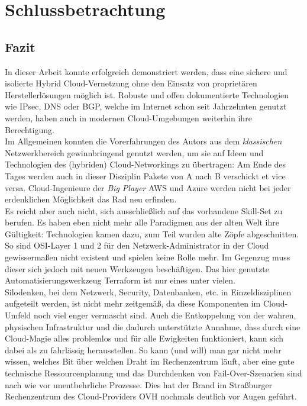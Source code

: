 \chapter{Schlussbetrachtung} \label{Fazit und Ausblick}

\section{Fazit}

In dieser Arbeit konnte erfolgreich demonstriert werden, dass eine sichere und isolierte Hybrid Cloud-Vernetzung ohne den Einsatz von proprietären Herstellerlösungen möglich ist. Robuste und offen dokumentierte Technologien wie IPsec, DNS oder BGP, welche im Internet schon seit Jahrzehnten genutzt werden, haben auch in \glqq modernen\grqq{} Cloud-Umgebungen weiterhin ihre Berechtigung.\\
Im Allgemeinen konnten die Vorerfahrungen des Autors aus dem \textit{klassischen} Netzwerkbereich gewinnbringend genutzt werden, um sie auf Ideen und Technologien des (hybriden) Cloud-Networkings zu übertragen: Am Ende des Tages werden auch in dieser Disziplin Pakete von A nach B verschickt et vice versa. Cloud-Ingenieure der \textit{Big Player} AWS und Azure werden nicht bei jeder erdenklichen Möglichkeit das Rad neu erfinden.\\
Es reicht aber auch nicht, sich ausschließlich auf das vorhandene Skill-Set zu berufen. Es haben eben nicht mehr alle Paradigmen aus der \glqq alten Welt\grqq{} ihre Gültigkeit: Technologien kamen dazu, zum Teil wurden alte Zöpfe abgeschnitten. So sind OSI-Layer 1 und 2 für den Netzwerk-Administrator in der Cloud gewissermaßen nicht existent und spielen keine Rolle mehr. Im Gegenzug muss dieser sich jedoch mit neuen Werkzeugen beschäftigen. Das hier genutzte Automatisierungswerkzeug Terraform ist nur eines unter vielen.\\
Silodenken, bei dem Netzwerk, Security, Datenbanken, etc. in Einzeldisziplinen aufgeteilt werden, ist nicht mehr zeitgemäß, da diese Komponenten im Cloud-Umfeld noch viel enger vermascht sind. Auch die Entkoppelung von der \glqq wahren\grqq{}, physischen Infrastruktur und die dadurch unterstützte Annahme, dass durch eine \glqq Cloud-Magie\grqq{} alles problemlos und für alle Ewigkeiten funktioniert, kann sich dabei als zu fahrlässig herausstellen. So kann (und will) man gar nicht mehr wissen, \glqq welches Bit über welchen Draht im Rechenzentrum läuft\grqq{}, aber eine gute technische Ressourcenplanung und das Durchdenken von Fail-Over-Szenarien sind nach wie vor unentbehrliche Prozesse. Dies hat der Brand im Straßburger Rechenzentrum des Cloud-Providers OVH nochmals deutlich vor Augen geführt\cite{ChristofKerkmann2021}.\\

